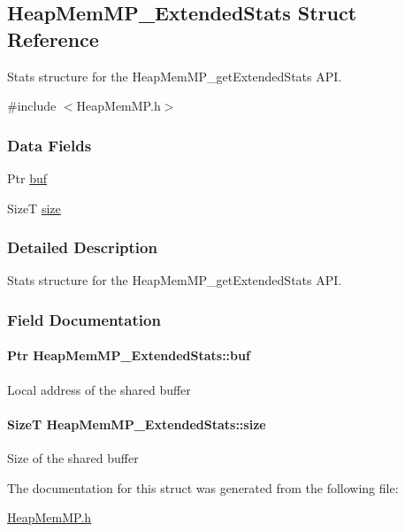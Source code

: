 \subsection{HeapMemMP\_\-ExtendedStats Struct Reference}
\label{struct_heap_mem_m_p___extended_stats}


Stats structure for the HeapMemMP\_\-getExtendedStats API.  




{\ttfamily \#include $<$HeapMemMP.h$>$}

\subsubsection*{Data Fields}
\begin{DoxyCompactItemize}
\item 
Ptr \hyperlink{struct_heap_mem_m_p___extended_stats_acff359a735a267f8d845c7b910413ddc}{buf}
\item 
SizeT \hyperlink{struct_heap_mem_m_p___extended_stats_a23b8e4b1c1d36b954ca7dacffad1c940}{size}
\end{DoxyCompactItemize}


\subsubsection{Detailed Description}
Stats structure for the HeapMemMP\_\-getExtendedStats API. 

\subsubsection{Field Documentation}
\paragraph[{buf}]{\setlength{\rightskip}{0pt plus 5cm}Ptr {\bf HeapMemMP\_\-ExtendedStats::buf}}\hfill\label{struct_heap_mem_m_p___extended_stats_acff359a735a267f8d845c7b910413ddc}
Local address of the shared buffer 
\paragraph[{size}]{\setlength{\rightskip}{0pt plus 5cm}SizeT {\bf HeapMemMP\_\-ExtendedStats::size}}\hfill\label{struct_heap_mem_m_p___extended_stats_a23b8e4b1c1d36b954ca7dacffad1c940}
Size of the shared buffer 

The documentation for this struct was generated from the following file:\begin{DoxyCompactItemize}
\item 
\hyperlink{_heap_mem_m_p_8h}{HeapMemMP.h}\end{DoxyCompactItemize}
